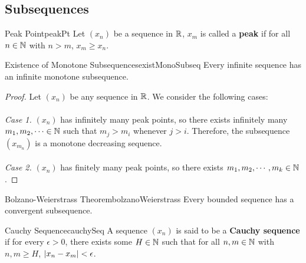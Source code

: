 \documentclass[math]{amznotes}
\theoremstyle{remark}
\begin{document}
\subsection{Subsequences}
\begin{dfnbox}{Peak Point}{peakPt}
    Let $(x_n)$ be a sequence in $\mathbb{R}$, $x_m$ is called a {\color{red} \textbf{peak}} if for all $n \in \mathbb{N}$ with $n > m$, $x_m \geq x_n$.
\end{dfnbox}
\begin{thmbox}{Existence of Monotone Subsequences}{existMonoSubseq}
    Every infinite sequence has an infinite monotone subsequence.
    \tcblower
    \begin{proof}
        Let $(x_n)$ be any sequence in $\mathbb{R}$. We consider the following cases:
        \\\\
        \textit{Case 1.} $(x_n)$ has infinitely many peak points, so there exists infinitely many $m_1, m_2, \cdots \in \mathbb{N}$ such that $m_j > m_i$ whenever $j > i$. Therefore, the subsequence $(x_{m_n})$ is a monotone decreasing sequence.
        \\\\
        \textit{Case 2.} $(x_n)$ has finitely many peak points, so there exists $m_1, m_2, \cdots, m_k\in \mathbb{N}$.
    \end{proof}
\end{thmbox}
\begin{thmbox}{Bolzano-Weierstrass Theorem}{bolzanoWeierstrass}
    Every bounded sequence has a convergent subsequence.
\end{thmbox}
\begin{dfnbox}{Cauchy Sequence}{cauchySeq}
    A sequence $(x_n)$ is said to be a {\color{red} \textbf{Cauchy sequence}} if for every $\epsilon > 0$, there exists some $H \in \mathbb{N}$ such that for all $n, m \in \mathbb{N}$ with $n, m \geq H$, ${\left\lvert {x_n - x_m} \right\rvert} < \epsilon$.
\end{dfnbox}
\end{document}
